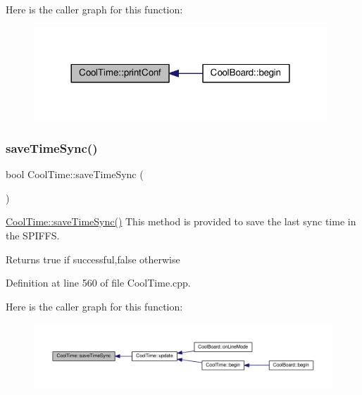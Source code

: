 Here is the caller graph for this function\+:
\nopagebreak
\begin{figure}[H]
\begin{center}
\leavevmode
\includegraphics[width=312pt]{class_cool_time_af355e7f9b3898211cd2ff25eab5933b1_icgraph}
\end{center}
\end{figure}
\mbox{\label{class_cool_time_ae9658c9b377510d469e3b88edf33ee85}} 
\subsubsection{\texorpdfstring{save\+Time\+Sync()}{saveTimeSync()}}
{\footnotesize\ttfamily bool Cool\+Time\+::save\+Time\+Sync (\begin{DoxyParamCaption}{ }\end{DoxyParamCaption})}

\hyperlink{class_cool_time_ae9658c9b377510d469e3b88edf33ee85}{Cool\+Time\+::save\+Time\+Sync()} This method is provided to save the last sync time in the S\+P\+I\+F\+FS.

\begin{DoxyReturn}{Returns}
true if successful,false otherwise 
\end{DoxyReturn}


Definition at line 560 of file Cool\+Time.\+cpp.

Here is the caller graph for this function\+:
\nopagebreak
\begin{figure}[H]
\begin{center}
\leavevmode
\includegraphics[width=350pt]{class_cool_time_ae9658c9b377510d469e3b88edf33ee85_icgraph}
\end{center}
\end{figure}
\mbox{\label{class_cool_time_a236a38d120dc53bc67456d763838c5a1}} 
